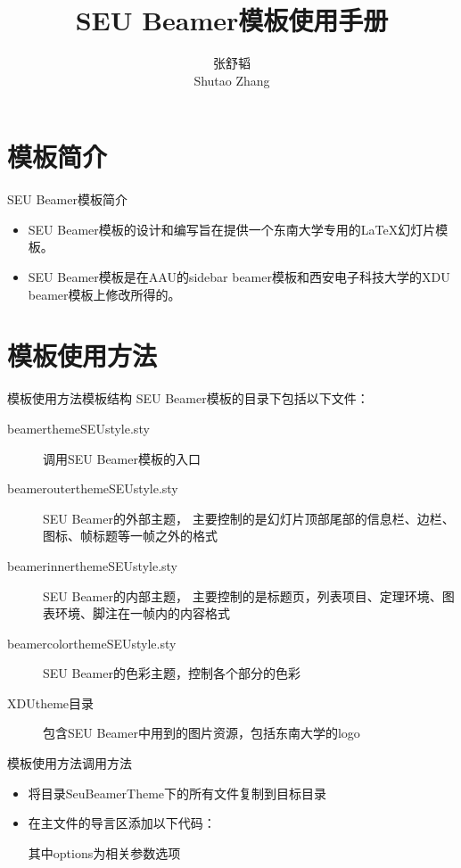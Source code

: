 \documentclass[10pt]{beamer}
\title[使用手册]{SEU Beamer模板使用手册}
\author[张舒韬]{张舒韬 \\ Shutao Zhang}
\institute[SEU KSE Lab]{东南大学\ 计算机科学与工程学院\ 知识工程实验室}
\begin{document}
	{\background
		\begin{frame}
			\titlepage
		\end{frame}
	}
	
	
	\section{模板简介}
	\begin{frame}{SEU Beamer模板简介}
		\begin{itemize}
			\item<1-> SEU Beamer模板的设计和编写旨在提供一个东南大学专用的LaTeX幻灯片模板。
			\item<2-> SEU Beamer模板是在\alert{AAU的sidebar beamer模板}和\alert{西安电子科技大学的XDU beamer}模板上修改所得的。
		\end{itemize}
	\end{frame}

	\section[使用方法]{模板使用方法}
	
	\begin{frame}{模板使用方法}{模板结构}
		SEU Beamer模板的目录下包括以下文件：
		\begin{description}
			\item[beamerthemeSEUstyle.sty] 调用SEU Beamer模板的入口
			\item[beamerouterthemeSEUstyle.sty] SEU Beamer的外部主题，
				主要控制的是幻灯片顶部尾部的信息栏、边栏、图标、帧标题等一帧之外的格式
			\item[beamerinnerthemeSEUstyle.sty] SEU Beamer的内部主题，
				主要控制的是标题页，列表项目、定理环境、图表环境、脚注在一帧内的内容格式
			\item[beamercolorthemeSEUstyle.sty] SEU Beamer的色彩主题，控制各个部分的色彩
			\item[XDUtheme目录] 包含SEU Beamer中用到的图片资源，包括东南大学的logo
		\end{description}
	\end{frame}

	\begin{frame}{模板使用方法}{调用方法}
		\begin{itemize}
			\item 将目录SeuBeamerTheme下的所有文件复制到目标目录
			\item 在主文件的导言区添加以下代码：
				
				其中options为相关参数选项
			
		\end{itemize}
	\end{frame}
	
\end{document}
